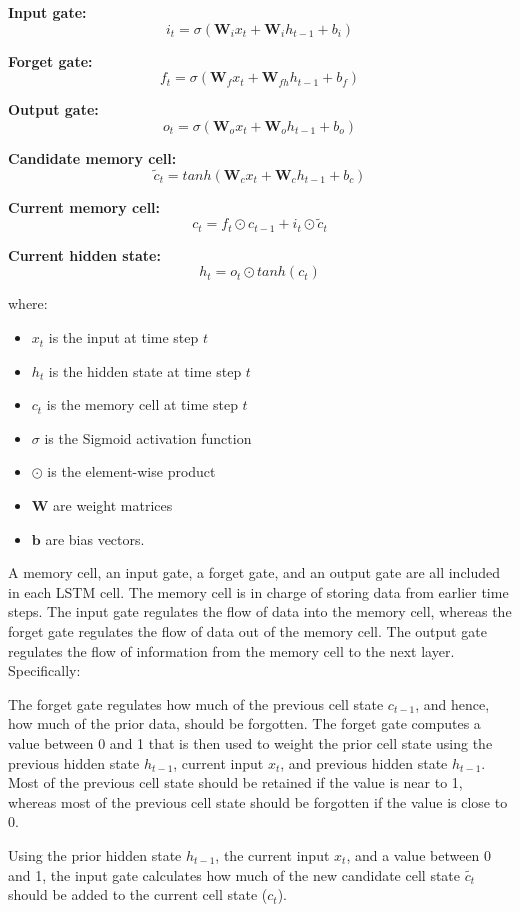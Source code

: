 \documentclass[a4paper]{article}
\begin{document}
\textbf{Input gate:}
$$ i_t = \sigma(\mathbf{W}_{i} x_t + \mathbf{W}_{i} h_{t-1} + b_i) $$

\textbf{Forget gate:}
$$ f_t = \sigma(\mathbf{W}_{f} x_t + \mathbf{W}_{fh} h_{t-1} + b_f) $$

\textbf{Output gate:}
$$ o_t = \sigma(\mathbf{W}_{o} x_t + \mathbf{W}_{o} h_{t-1} + b_o) $$

\textbf{Candidate memory cell:}
$$ \tilde{c}_t = tanh(\mathbf{W}_{c} x_t + \mathbf{W}_{c} h_{t-1} + b_c) $$

\textbf{Current memory cell:}
$$ c_t = f_t \odot c_{t-1} + i_t \odot \tilde{c}_t $$

\textbf{Current hidden state:}
$$ h_t = o_t \odot tanh(c_t) $$

where:
\begin{itemize}[leftmargin=7.5pt]
\item $x_t$ is the input at time step $t$
\item $h_t$ is the hidden state at time step $t$
\item $c_t$ is the memory cell at time step $t$
\item $\sigma$ is the Sigmoid activation function
\item $\odot$ is the element-wise product
\item $\mathbf{W}$ are weight matrices
\item $\mathbf{b}$ are bias vectors.
\end{itemize}

A memory cell, an input gate, a forget gate, and an output gate are all included in each LSTM cell. The memory cell is in charge of storing data from earlier time steps. The input gate regulates the flow of data into the memory cell, whereas the forget gate regulates the flow of data out of the memory cell. The output gate regulates the flow of information from the memory cell to the next layer. Specifically:

The forget gate regulates how much of the previous cell state $c_{t-1}$, and hence, how much of the prior data, should be forgotten. The forget gate computes a value between 0 and 1 that is then used to weight the prior cell state using the previous hidden state $h_{t-1}$, current input $x_{t}$, and previous hidden state $h_{t-1}$. Most of the previous cell state should be retained if the value is near to 1, whereas most of the previous cell state should be forgotten if the value is close to 0.

Using the prior hidden state $h_{t-1}$, the current input $x_t$, and a value between 0 and 1, the input gate calculates how much of the new candidate cell state $\tilde{c_t}$ should be added to the current cell state ($c_t$).
\end{document}
